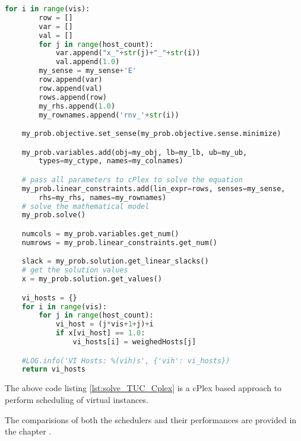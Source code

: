 \begin{lstlisting}[frame=single, language=Python, caption={The cPlex based TUC\_scheduler's solve\_TUC\_Cplex function}, label={lst:solve_TUC_Cplex}, escapechar=|]
	for i in range(vis):
		row = []
		var = []
		val = []
		for j in range(host_count):
			var.append("x_"+str(j)+"_"+str(i))
			val.append(1.0)
		my_sense = my_sense+'E'
		row.append(var)
		row.append(val)
		rows.append(row)
		my_rhs.append(1.0)
		my_rownames.append('rnv_'+str(i))

	my_prob.objective.set_sense(my_prob.objective.sense.minimize)

	my_prob.variables.add(obj=my_obj, lb=my_lb, ub=my_ub,
		types=my_ctype, names=my_colnames)

	# pass all parameters to cPlex to solve the equation
	my_prob.linear_constraints.add(lin_expr=rows, senses=my_sense,
		rhs=my_rhs, names=my_rownames)
	# solve the mathematical model
	my_prob.solve()

	numcols = my_prob.variables.get_num()
	numrows = my_prob.linear_constraints.get_num()

	slack = my_prob.solution.get_linear_slacks()
	# get the solution values
	x = my_prob.solution.get_values()

	vi_hosts = {}
	for i in range(vis):
		for j in range(host_count):
			vi_host = (j*vis+1+j)+i
			if x[vi_host] == 1.0:
				vi_hosts[i] = weighedHosts[j]

	#LOG.info('VI Hosts: %(vih)s', {'vih': vi_hosts})
	return vi_hosts
\end{lstlisting}

The above code listing \ref{lst:solve_TUC_Cplex} is a cPlex based approach to perform scheduling of virtual instances.

The comparisions of both the schedulers and their performances are provided in the chapter .
